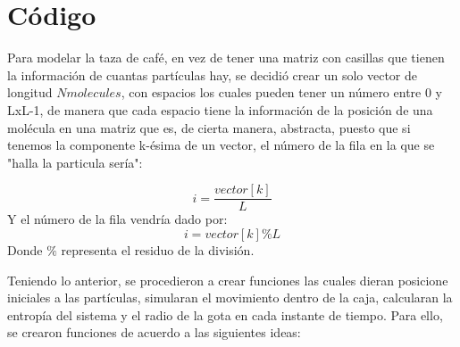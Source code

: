 \documentclass{article}
\begin{document}
\section{Código}
Para modelar la taza de café, en vez de tener una matriz con casillas que tienen la información de cuantas partículas hay, se decidió crear un solo vector de longitud $Nmolecules$, con espacios los cuales pueden tener un número entre 0 y LxL-1, de manera que cada espacio tiene la información de la posición de una molécula en una matriz que es, de cierta manera, abstracta, puesto que si tenemos la componente k-ésima de un vector, el número de la fila en la que se "halla la particula sería":\par
\begin{equation}
    i=\frac{vector[k]}{L}
    \label{eq_posi_i}
\end{equation}
Y el número de la fila vendría dado por:
\begin{equation}
    i=vector[k] \% L
    \label{eq_posi_j}
\end{equation}
Donde $\%$ representa el residuo de la división.\par
Teniendo lo anterior, se procedieron a crear funciones las cuales dieran posicione iniciales a las partículas, simularan el movimiento dentro de la caja, calcularan la entropía del sistema y el radio de la gota en cada instante de tiempo. Para ello, se crearon funciones de acuerdo a las siguientes ideas:
\end{document}
